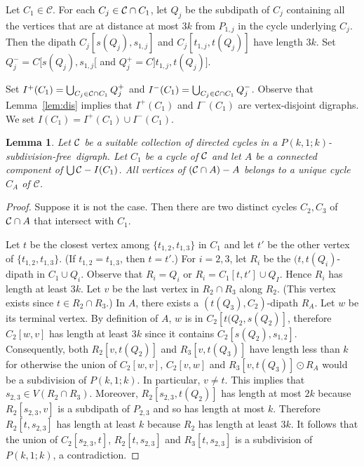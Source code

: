 \documentclass[utf8,10pt]{article}
\theoremstyle{plain}
\newtheorem{lemma}[theorem]{Lemma}
\theoremstyle{definition}
\theoremstyle{remark}
\newcommand{\free}{subdivision-free}
\begin{document}
Let $C_1\in \mathcal{C}$.
For each $C_j\in {\cal C} \cap C_1$, let $Q_j$ be the subdipath of $C_j$ 
containing all the vertices that are at distance at most $3k$ from $P_{1,j}$ in the cycle underlying $C_j$.
Then the dipath $C_j[s(Q_j), s_{1,j}]$ and  $C_j[t_{1,j},t (Q_j)]$ have length $3k$.
Set $Q^-_j=C[s(Q_j), s_{1,j}[$ and $Q^+_j=C]t_{1,j}, t(Q_j)]$.


Set $I^+(C_1) = \bigcup_{C_j\in {\cal C}\cap C_1} Q^+_j$ and $I^-(C_1) = \bigcup_{C_j\in {\cal C}\cap C_1} Q^-_j$.
Observe that Lemma~\ref{lem:dis} implies that $I^+(C_1)$ and $I^-(C_1)$ are vertex-disjoint digraphs. We set $I(C_1)=I^+(C_1)\cup I^-(C_1)$.




\begin{lemma}\label{lem:A}
Let ${\cal C}$ be a suitable collection of directed cycles in a $P(k,1;k)$-\free\ digraph.
Let $C_1$ be a cycle of ${\cal C}$ and let $A$ be a connected component of $\bigcup{\cal C} - I(C_1)$.
All vertices of $({\cal C}\cap A)  - A$ belongs to a unique cycle $C_A$ of $\mathcal{C}$.
\end{lemma}

\begin{proof}
Suppose it is not the case. Then there are two distinct cycles $C_2, C_3$ of ${\cal C}\cap A$ that intersect with $C_1$.

Let $t$ be the closest vertex among $\{t_{1,2}, t_{1,3}\}$ in $C_1$ and let $t'$ be the other vertex of $\{t_{1,2}, t_{1,3}\}$.
(If $t_{1,2}=t_{1,3}$, then $t=t'$.) For $i=2,3$, let $R_i$ be the $(t,t(Q_i)$-dipath in $C_1\cup Q_i$. Observe that $R_i=Q_i$ or $R_i=C_1[t,t']\cup Q_I$. Hence $R_i$ has length at least $3k$.
Let $v$ be the last vertex in $R_2\cap R_3$ along $R_2$. (This vertex exists since $t\in R_2\cap R_3$.) In $A$, there exists a $(t(Q_3), C_2)$-dipath $R_A$. Let $w$ be its terminal vertex. By definition of $A$, $w$ is in $C_2[t(Q_2, s(Q_2)]$, therefore $C_2[w,v]$ has length at least $3k$ since it contains $C_2[s(Q_2), s_{1,2}]$. Consequently, both $R_2[v,t(Q_2)]$ and $R_3[v,t(Q_3)]$ have length less than $k$ for otherwise the union of $C_2[w,v]$, $C_2[v,w]$ and $R_3[v,t(Q_3)]\odot R_A$ would be a subdivision of $P(k,1;k)$.
In particular, $v\neq t$. This implies that $s_{2,3}\in V(R_2\cap R_3)$.
Moreover, $R_2[s_{2,3}, t(Q_2)]$ has length at most $2k$ because $R_2[s_{2,3},v]$ is a subdipath of $P_{2,3}$ and so has length at most $k$.
Therefore $R_2[t,s_{2,3}]$ has length at least $k$ because $R_2$ has length at least $3k$.
It follows that the union of $C_2[s_{2,3},t]$,  $R_2[t,s_{2,3}]$ and  $R_3[t,s_{2,3}]$ is a subdivision of $P(k,1;k)$, a contradiction.
\end{proof}
\end{document}
